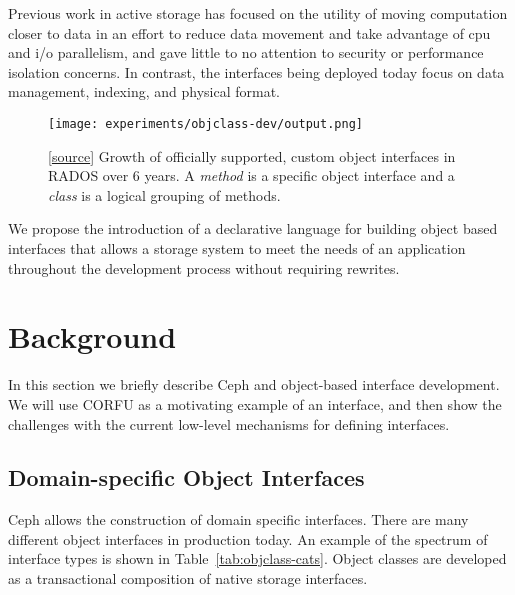 \documentclass[10pt,twocolumn]{article}
\begin{document}

Previous work in active storage has focused on the utility of moving
computation closer to data in an effort to reduce data movement and take
advantage of cpu and i/o parallelism, and gave little to no attention to
security or performance isolation concerns. In contrast, the interfaces being
deployed today focus on data management, indexing, and physical format.

\begin{figure}[ht]
  \centering
    \texttt{[image: experiments/objclass-dev/output.png]}
    \caption{
[\href{https://github.com/noahdesu/zlog-popper/tree/master/experiments/objclass-dev/visualize.ipynb}{source}]
Growth of officially supported, custom object interfaces in RADOS over 6
years. A \emph{method} is a specific object interface and a \emph{class} is a
logical grouping of methods.
}
\label{fig:objclass-dev}
\end{figure}

We propose the introduction of a declarative language for building object
based interfaces that allows a storage system to meet the needs of an
application throughout the development process without requiring rewrites.

\section{Background}

In this section we briefly describe Ceph and object-based interface
development. We will use CORFU as a motivating example of an interface, and
then show the challenges with the current low-level mechanisms for defining
interfaces.

\subsection{Domain-specific Object Interfaces}

Ceph allows the construction of domain specific interfaces. There are many
different object interfaces in production today. An example of the spectrum of
interface types is shown in Table~\ref{tab:objclass-cats}. Object classes are
developed as a transactional composition of native storage interfaces.
\end{document}
